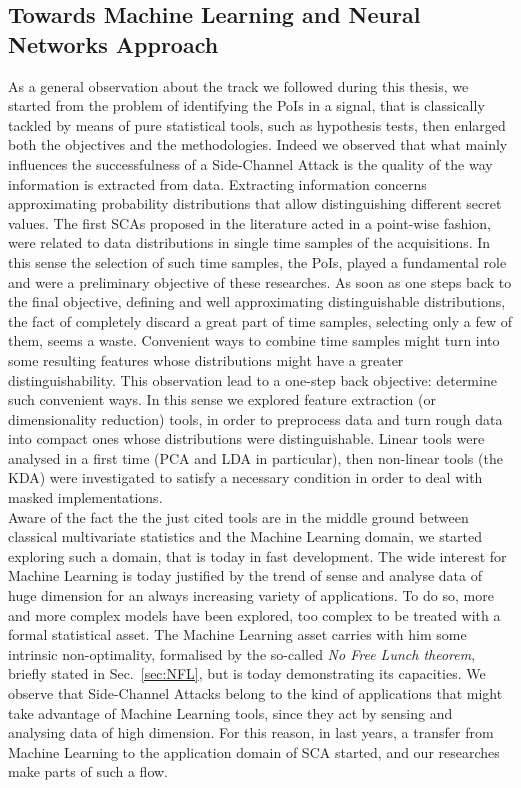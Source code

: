 \subsection{Towards Machine Learning and Neural Networks Approach}
As a general observation about the track we followed during this thesis, we started from the problem of identifying the PoIs in a signal, that is classically tackled by means of pure statistical tools, such as hypothesis tests,  then enlarged both the objectives and the methodologies. Indeed we observed that what mainly influences the successfulness of a Side-Channel Attack is the quality of the way information is extracted from data. Extracting information concerns approximating probability distributions that allow distinguishing different secret values. The first SCAs proposed in the literature acted in a point-wise fashion, \ie were related to data distributions in single time samples of the acquisitions. In this sense the selection of such time samples, the PoIs, played a fundamental role and were a preliminary objective of these researches. As soon as one steps back to the final objective, \ie defining and well approximating distinguishable distributions, the fact of completely discard a great part of time samples, selecting only a few of them, seems a waste. Convenient ways to combine time samples might turn into some resulting features whose distributions might have a greater distinguishability. This observation lead to a one-step back objective: determine such convenient ways. In this sense we explored feature extraction (or dimensionality reduction) tools, in order to preprocess data and turn rough data into compact ones whose distributions were distinguishable. Linear tools were analysed in a first time (PCA and LDA in particular), then non-linear tools (the KDA) were investigated to satisfy a necessary condition in order to deal with masked implementations. \\

Aware of the fact the the just cited tools are in the middle ground between classical multivariate statistics and the Machine Learning domain, we started exploring such a domain, that is today  in fast development. The wide interest for Machine Learning is today justified by the trend of sense and analyse data of huge dimension for an always increasing variety of applications. To do so, more and more complex models have been explored, too complex to be treated with a formal statistical asset. The Machine Learning asset carries with him some intrinsic non-optimality, formalised by the so-called \emph{No Free Lunch theorem}, briefly stated in Sec.~\ref{sec:NFL}, but is today demonstrating its capacities. We observe that Side-Channel Attacks belong to the kind of applications that might take advantage of Machine Learning tools, since they act by sensing and analysing data of high dimension. For this reason, in last years, a transfer from Machine Learning to the application domain of SCA started, and our researches make parts of such a flow. \\

